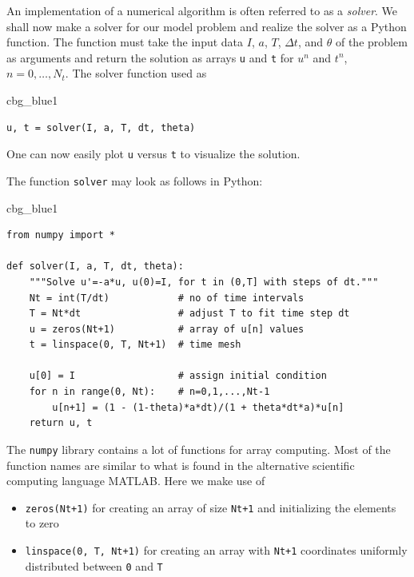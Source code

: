 \documentclass[%
oneside,                 %
final,                   %
10pt]{article}
\newenvironment{_cod_tight}[1]{
   \def\FrameCommand{\colorbox{#1}}
   \FrameRule0.6pt\MakeFramed {\FrameRestore}\vskip3mm}
   {\vskip0mm\endMakeFramed}
\newenvironment{cod}[1]{
\bgroup\rmfamily
\fboxsep=0mm\relax
\begin{_cod_tight}{#1}
\list{}{\parsep=-2mm\parskip=0mm\topsep=0pt\leftmargin=2mm
\rightmargin=2\leftmargin\leftmargin=4pt\relax}
\item\relax}
{\endlist\end{_cod_tight}\egroup}
\begin{document}
\noindent
An implementation of a numerical algorithm is often referred to as
a \emph{solver}. We shall now make a solver for our model problem and
realize the solver as a Python function. The function must take
the input data $I$, $a$, $T$, $\Delta t$, and $\theta$ of the problem
as arguments and return the solution as arrays \texttt{u} and \texttt{t} for
$u^n$ and $t^n$, $n=0,\ldots,N_t$. The solver function used as

\begin{cod}{cbg_blue1}\begin{Verbatim}[numbers=none,fontsize=\fontsize{9pt}{9pt},baselinestretch=0.95,xleftmargin=2mm]
u, t = solver(I, a, T, dt, theta)
\end{Verbatim}
\end{cod}
\noindent
One can now easily plot \texttt{u} versus \texttt{t} to visualize the solution.

The function \texttt{solver} may look as follows in Python:

\begin{cod}{cbg_blue1}\begin{Verbatim}[numbers=none,fontsize=\fontsize{9pt}{9pt},baselinestretch=0.95,xleftmargin=2mm]
from numpy import *

def solver(I, a, T, dt, theta):
    """Solve u'=-a*u, u(0)=I, for t in (0,T] with steps of dt."""
    Nt = int(T/dt)            # no of time intervals
    T = Nt*dt                 # adjust T to fit time step dt
    u = zeros(Nt+1)           # array of u[n] values
    t = linspace(0, T, Nt+1)  # time mesh

    u[0] = I                  # assign initial condition
    for n in range(0, Nt):    # n=0,1,...,Nt-1
        u[n+1] = (1 - (1-theta)*a*dt)/(1 + theta*dt*a)*u[n]
    return u, t
\end{Verbatim}
\end{cod}
\noindent

The \texttt{numpy} library contains a lot of functions for array computing. Most
of the function names are similar to what is found
in the alternative scientific computing language MATLAB. Here
we make use of

\begin{itemize}
 \item \texttt{zeros(Nt+1)} for creating an array of size \texttt{Nt+1}
   and initializing the elements to zero

 \item \texttt{linspace(0, T, Nt+1)} for creating an array with \texttt{Nt+1}
   coordinates uniformly distributed between \texttt{0} and \texttt{T}
\end{itemize}
\end{document}
